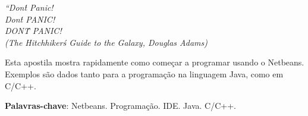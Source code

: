\documentclass[
	12pt,				%
	twoside,			%
	a4paper,			%
	english,			%
	french,				%
	spanish,			%
	brazil				%
	]{abntex2}
\begin{document}

%
%

\begin{epigrafe}
    \vspace*{\fill}
	\begin{flushright}
		\textit{``Don\'t Panic!\\
		Don\'t PANIC! \\
		DON\'T PANIC! \\
		(The Hitchhiker\'s Guide to the Galaxy, Douglas Adams)}
	\end{flushright}
\end{epigrafe}


\pagebreak 
\setlength{\absparsep}{18pt} %
\begin{resumo}
Esta apostila mostra rapidamente como começar a programar usando o Netbeans. Exemplos são dados tanto para a programação na linguagem Java, como em C/C++.

 \textbf{Palavras-chave}: Netbeans. Programação. IDE. Java. C/C++.
\end{resumo}

%
% 

% 
\end{document}
